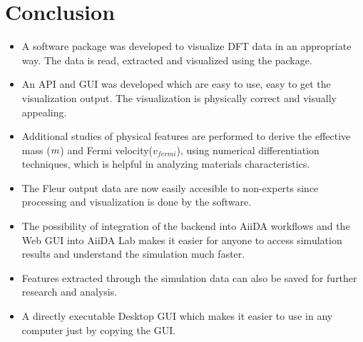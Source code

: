 
\chapter{Conclusion}
\label{chap:conclusion}

\begin{itemize}
    \item A software package was developed to visualize DFT data in an appropriate way. The data is read, extracted and visualized using the package.
    \item An API and GUI was developed which are easy to use, easy to get the
        visualization output. The visualization is physically correct and visually appealing.
    \item Additional studies of physical features are performed to derive the
        effective mass ($m\*$) and Fermi velocity($v_{fermi}$), using numerical
        differentiation techniques, which is helpful in analyzing materials
        characteristics.
    \item The Fleur output data are now easily accesible to non-experts since
        processing and visualization is done by the software.
    \item The possibility of integration of the backend into AiiDA workflows and
        the Web GUI into AiiDA Lab makes it easier for anyone to access simulation results and understand the simulation much faster.
    \item Features extracted through the simulation data can also be saved for further research and analysis.
    \item A directly executable Desktop GUI which makes it easier to use in any computer just by copying the GUI.
\end{itemize}

